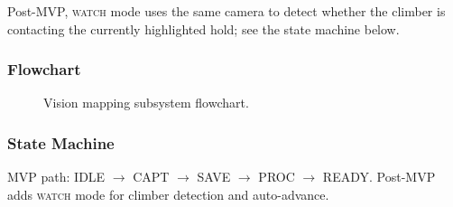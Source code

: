 \documentclass[12pt]{extarticle}
\begin{document}
Post-MVP, \textsc{watch} mode uses the same camera to detect whether the climber is
contacting the currently highlighted hold; see the state machine below.


\subsubsection{Flowchart}

\begin{figure}[H]
\centering
{}
\caption{Vision mapping subsystem flowchart.}
\label{fig:flow-vision}
\end{figure}

\subsubsection{State Machine}

MVP path: IDLE $\to$ CAPT $\to$ SAVE $\to$ PROC $\to$ READY.
Post-MVP adds \textsc{watch} mode for climber detection and auto-advance.
\end{document}
